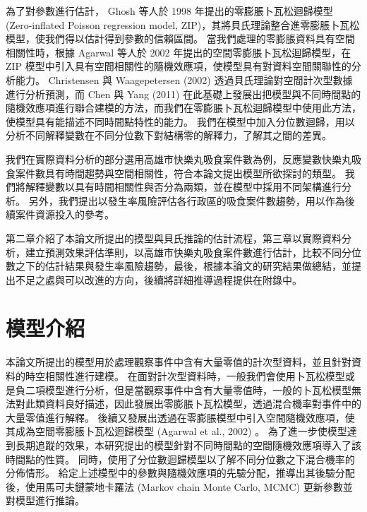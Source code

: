 \documentclass[12pt,a4paper]{article}
\begin{document}
\begin{CJK}{UTF8}{bkai}
為了對參數進行估計， Ghosh 等人於 1998 年提出的零膨脹卜瓦松迴歸模型 (Zero-inflated Poisson regression model, ZIP)，其將貝氏理論整合進零膨脹卜瓦松模型，使我們得以估計得到參數的信賴區間。
當我們處理的零膨脹資料具有空間相關性時，根據 Agarwal 等人於 2002 年提出的空間零膨脹卜瓦松迴歸模型，在 ZIP 模型中引入具有空間相關性的隨機效應項，使模型具有對資料空間關聯性的分析能力。
Christensen 與 Waagepetersen (2002) 透過貝氏理論對空間計次型數據進行分析預測，而 Chen 與 Yang (2011) 在此基礎上發展出把模型與不同時間點的隨機效應項進行聯合建模的方法，而我們在零膨脹卜瓦松迴歸模型中使用此方法，使模型具有能描述不同時間點特性的能力。
我們在模型中加入分位數迴歸，用以分析不同解釋變數在不同分位數下對結構零的解釋力，了解其之間的差異。

我們在實際資料分析的部分選用高雄市快樂丸吸食案件數為例，反應變數快樂丸吸食案件數具有時間趨勢與空間相關性，符合本論文提出模型所欲探討的類型。
我們將解釋變數以具有時間相關性與否分為兩類，並在模型中採用不同架構進行分析。
另外，我們提出以發生率風險評估各行政區的吸食案件數趨勢，用以作為後續案件資源投入的參考。

第二章介紹了本論文所提出的摸型與貝氏推論的估計流程，第三章以實際資料分析，建立預測效果評估準則，以高雄市快樂丸吸食案件數進行估計，比較不同分位數之下的估計結果與發生率風險趨勢，最後，根據本論文的研究結果做總結，並提出不足之處與可以改進的方向，後續將詳細推導過程提供在附錄中。

\newpage
\section{模型介紹}\label{sec:2}
本論文所提出的模型用於處理觀察事件中含有大量零值的計次型資料，並且針對資料的時空相關性進行建模。
在面對計次型資料時，一般我們會使用卜瓦松模型或是負二項模型進行分析，但是當觀察事件中含有大量零值時，一般的卜瓦松模型無法對此類資料良好描述，因此發展出零膨脹卜瓦松模型，透過混合機率對事件中的大量零值進行解釋。
後續又發展出透過在零膨脹模型中引入空間隨機效應項，使其成為空間零膨脹卜瓦松迴歸模型 (Agarwal et al., 2002) 。
為了進一步使模型達到長期追蹤的效果，本研究提出的模型針對不同時間點的空間隨機效應項導入了該時間點的性質。
同時，使用了分位數迴歸模型以了解不同分位數之下混合機率的分佈情形。
給定上述模型中的參數與隨機效應項的先驗分配，推導出其後驗分配後，使用馬可夫鏈蒙地卡羅法 (Markov chain Monte Carlo, MCMC) 更新參數並對模型進行推論。


\end{CJK}
\end{document}

